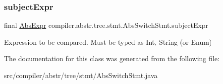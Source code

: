 \subsubsection{\texorpdfstring{subject\+Expr}{subjectExpr}}
{\footnotesize\ttfamily final \hyperlink{classcompiler_1_1abstr_1_1tree_1_1expr_1_1_abs_expr}{Abs\+Expr} compiler.\+abstr.\+tree.\+stmt.\+Abs\+Switch\+Stmt.\+subject\+Expr}

Expression to be compared. Must be typed as Int, String (or Enum) 

The documentation for this class was generated from the following file\+:\begin{DoxyCompactItemize}
\item 
src/compiler/abstr/tree/stmt/Abs\+Switch\+Stmt.\+java\end{DoxyCompactItemize}
